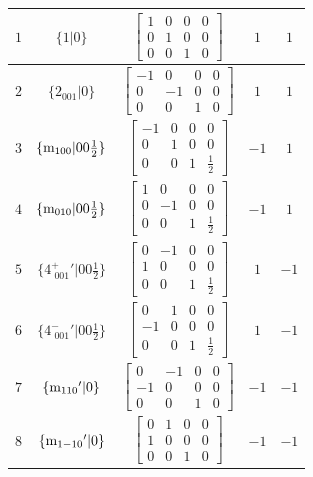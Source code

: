 \documentclass[fleqn,8pt]{jsarticle}
\begin{document}
\begin{longtable}{ccccc}
$ 1 $ & $ \{1|0\} $ & $ \begin{bmatrix} 1 & 0 & 0 & 0 \\ 0 & 1 & 0 & 0 \\ 0 & 0 & 1 & 0 \end{bmatrix} $ & $ 1 $ & $ 1 $ \\ \hline
$ 2 $ & $ \{2{}_{001}|0\} $ & $ \begin{bmatrix} -1 & 0 & 0 & 0 \\ 0 & -1 & 0 & 0 \\ 0 & 0 & 1 & 0 \end{bmatrix} $ & $ 1 $ & $ 1 $ \\ \hline
$ 3 $ & $ \{{\rm m}_{100}|0 0 \frac{1}{2}\} $ & $ \begin{bmatrix} -1 & 0 & 0 & 0 \\ 0 & 1 & 0 & 0 \\ 0 & 0 & 1 & \frac{1}{2} \end{bmatrix} $ & $ -1 $ & $ 1 $ \\ \hline
$ 4 $ & $ \{{\rm m}_{010}|0 0 \frac{1}{2}\} $ & $ \begin{bmatrix} 1 & 0 & 0 & 0 \\ 0 & -1 & 0 & 0 \\ 0 & 0 & 1 & \frac{1}{2} \end{bmatrix} $ & $ -1 $ & $ 1 $ \\ \hline
$ 5 $ & $ \{4^{+}_{\,\,001}{}'|0 0 \frac{1}{2}\} $ & $ \begin{bmatrix} 0 & -1 & 0 & 0 \\ 1 & 0 & 0 & 0 \\ 0 & 0 & 1 & \frac{1}{2} \end{bmatrix} $ & $ 1 $ & $ -1 $ \\ \hline
$ 6 $ & $ \{4^{-}_{\,\,001}{}'|0 0 \frac{1}{2}\} $ & $ \begin{bmatrix} 0 & 1 & 0 & 0 \\ -1 & 0 & 0 & 0 \\ 0 & 0 & 1 & \frac{1}{2} \end{bmatrix} $ & $ 1 $ & $ -1 $ \\ \hline
$ 7 $ & $ \{{\rm m}_{110}{}'|0\} $ & $ \begin{bmatrix} 0 & -1 & 0 & 0 \\ -1 & 0 & 0 & 0 \\ 0 & 0 & 1 & 0 \end{bmatrix} $ & $ -1 $ & $ -1 $ \\ \hline
$ 8 $ & $ \{{\rm m}_{1-10}{}'|0\} $ & $ \begin{bmatrix} 0 & 1 & 0 & 0 \\ 1 & 0 & 0 & 0 \\ 0 & 0 & 1 & 0 \end{bmatrix} $ & $ -1 $ & $ -1 $ \\
\end{longtable}
\end{document}
